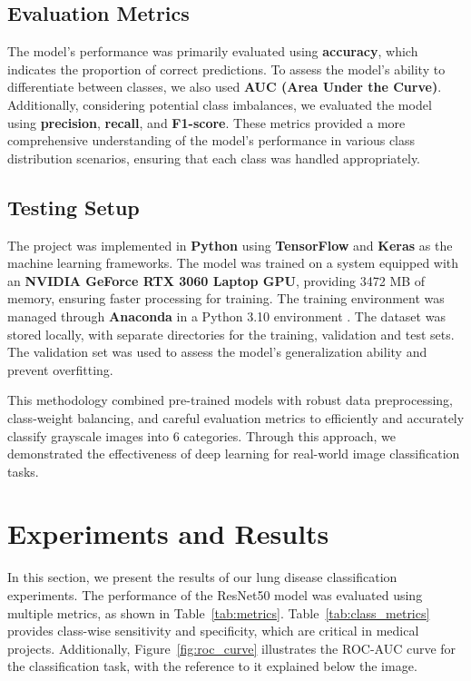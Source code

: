 \documentclass[journal]{IEEEtran}
\begin{document}
\subsection{Evaluation Metrics}
The model's performance was primarily evaluated using \textbf{accuracy}, which indicates the proportion of correct predictions. To assess the model’s ability to differentiate between classes, we also used \textbf{AUC (Area Under the Curve)}. Additionally, considering potential class imbalances, we evaluated the model using \textbf{precision}, \textbf{recall}, and \textbf{F1-score}. These metrics provided a more comprehensive understanding of the model's performance in various class distribution scenarios, ensuring that each class was handled appropriately.

\subsection{Testing Setup}
The project was implemented in \textbf{Python} \cite{python} using \textbf{TensorFlow} and \textbf{Keras}\cite{tensorflow} as the machine learning frameworks. The model was trained on a system equipped with an \textbf{NVIDIA GeForce RTX 3060 Laptop GPU}, providing 3472 MB of memory, ensuring faster processing for training. The training environment was managed through \textbf{Anaconda} in a Python 3.10 environment \cite{anaconda}. The dataset was stored locally, with separate directories for the training, validation and test sets. The validation set was used to assess the model’s generalization ability and prevent overfitting.

This methodology combined pre-trained models with robust data preprocessing, class-weight balancing, and careful evaluation metrics to efficiently and accurately classify grayscale images into 6 categories. Through this approach, we demonstrated the effectiveness of deep learning for real-world image classification tasks.

\section{Experiments and Results}
In this section, we present the results of our lung disease classification experiments. The performance of the ResNet50 model was evaluated using multiple metrics, as shown in Table~\ref{tab:metrics}. Table~\ref{tab:class_metrics} provides class-wise sensitivity and specificity, which are critical in medical projects. Additionally, Figure~\ref{fig:roc_curve} illustrates the ROC-AUC curve for the classification task, with the reference to it explained below the image.
\end{document}
